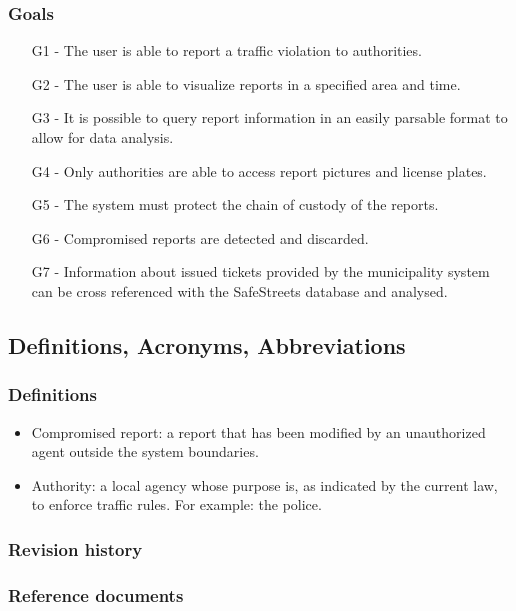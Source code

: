 \subsubsection{Goals}
\begin{itemize}
\item
[G1] - The user is able to report a traffic violation to authorities.
\item
[G2] - The user is able to visualize reports in a specified area and time.
\item
[G3] - It is possible to query report information in an easily parsable format to allow for data analysis.
\item
[G4] - Only authorities are able to access report pictures and license plates.
\item
[G5] - The system must protect the chain of custody of the reports. 
\item
[G6] - Compromised reports are detected and discarded.
\item
[G7] - Information about issued tickets provided by the municipality system can be cross referenced with the SafeStreets database and analysed.
\end{itemize}

\subsection{Definitions, Acronyms, Abbreviations}
\subsubsection{Definitions}
\begin{itemize}
    \item Compromised report: a report that has been modified by an unauthorized agent outside the system boundaries.
    \item Authority: a local agency whose purpose is, as indicated by the current law, to enforce traffic rules. For example: the police.      
\end{itemize}

\subsubsection{Revision history}
\subsubsection{Reference documents}

